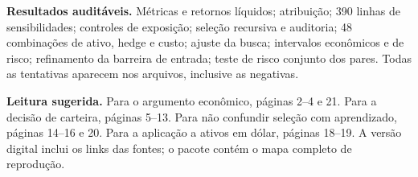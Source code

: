 \documentclass[11pt,a4paper]{article}
\begin{document}
\textbf{Resultados auditáveis.} Métricas e retornos líquidos; atribuição; 390 linhas de sensibilidades; controles de exposição; seleção recursiva e auditoria; 48 combinações de ativo, hedge e custo; ajuste da busca; intervalos econômicos e de risco; refinamento da barreira de entrada; teste de risco conjunto dos pares. Todas as tentativas aparecem nos arquivos, inclusive as negativas.

\textbf{Leitura sugerida.} Para o argumento econômico, páginas 2--4 e 21. Para a decisão de carteira, páginas 5--13. Para não confundir seleção com aprendizado, páginas 14--16 e 20. Para a aplicação a ativos em dólar, páginas 18--19. A versão digital inclui os links das fontes; o pacote contém o mapa completo de reprodução.
\end{document}
